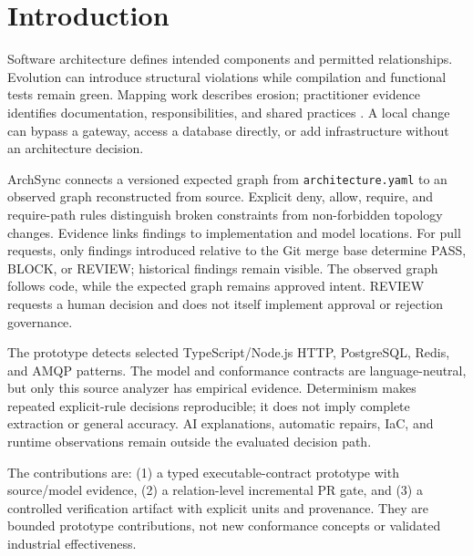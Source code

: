 \section{Introduction}
Software architecture defines intended components and permitted relationships. Evolution can introduce structural violations while compilation and functional tests remain green. Mapping work describes erosion; practitioner evidence identifies documentation, responsibilities, and shared practices \cite{li2022erosion,anthony2024drifting}. A local change can bypass a gateway, access a database directly, or add infrastructure without an architecture decision.

ArchSync connects a versioned expected graph from \texttt{architecture.yaml} to an observed graph reconstructed from source. Explicit deny, allow, require, and require-path rules distinguish broken constraints from non-forbidden topology changes. Evidence links findings to implementation and model locations. For pull requests, only findings introduced relative to the Git merge base determine PASS, BLOCK, or REVIEW; historical findings remain visible. The observed graph follows code, while the expected graph remains approved intent. REVIEW requests a human decision and does not itself implement approval or rejection governance.

The prototype detects selected TypeScript/Node.js HTTP, PostgreSQL, Redis, and AMQP patterns. The model and conformance contracts are language-neutral, but only this source analyzer has empirical evidence. Determinism makes repeated explicit-rule decisions reproducible; it does not imply complete extraction or general accuracy. AI explanations, automatic repairs, IaC, and runtime observations remain outside the evaluated decision path.

The contributions are: (1) a typed executable-contract prototype with source/model evidence, (2) a relation-level incremental PR gate, and (3) a controlled verification artifact with explicit units and provenance. They are bounded prototype contributions, not new conformance concepts or validated industrial effectiveness.

